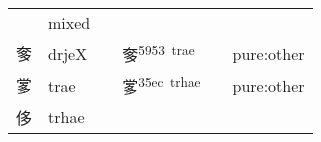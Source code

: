 \documentclass[14pt,a4paper]{scrartcl}
\begin{document}
\begin{longtable}[c]{@{}llllll@{}}
\begin{minipage}[t]{0.14\columnwidth}
\strut\end{minipage} &
\begin{minipage}[t]{0.14\columnwidth}\raggedright\strut
mixed
\strut\end{minipage}\tabularnewline
\begin{minipage}[t]{0.14\columnwidth}\raggedright\strut
奓
\strut\end{minipage} &
\begin{minipage}[t]{0.14\columnwidth}\raggedright\strut
drjeX
\strut\end{minipage} &
\begin{minipage}[t]{0.14\columnwidth}\raggedright\strut
\strut\end{minipage} &
\begin{minipage}[t]{0.14\columnwidth}\raggedright\strut
奓\textsuperscript{5953~trae}
\strut\end{minipage} &
\begin{minipage}[t]{0.14\columnwidth}\raggedright\strut
\strut\end{minipage} &
\begin{minipage}[t]{0.14\columnwidth}\raggedright\strut
pure:other
\strut\end{minipage}\tabularnewline
\begin{minipage}[t]{0.14\columnwidth}\raggedright\strut
㗬
\strut\end{minipage} &
\begin{minipage}[t]{0.14\columnwidth}\raggedright\strut
trae
\strut\end{minipage} &
\begin{minipage}[t]{0.14\columnwidth}\raggedright\strut
\strut\end{minipage} &
\begin{minipage}[t]{0.14\columnwidth}\raggedright\strut
㗬\textsuperscript{35ec~trhae}
\strut\end{minipage} &
\begin{minipage}[t]{0.14\columnwidth}\raggedright\strut
\strut\end{minipage} &
\begin{minipage}[t]{0.14\columnwidth}\raggedright\strut
pure:other
\strut\end{minipage}\tabularnewline
\begin{minipage}[t]{0.14\columnwidth}\raggedright\strut
侈
\strut\end{minipage} &
\begin{minipage}[t]{0.14\columnwidth}\raggedright\strut
trhae
\strut\end{minipage} &

\end{longtable}
\end{document}
